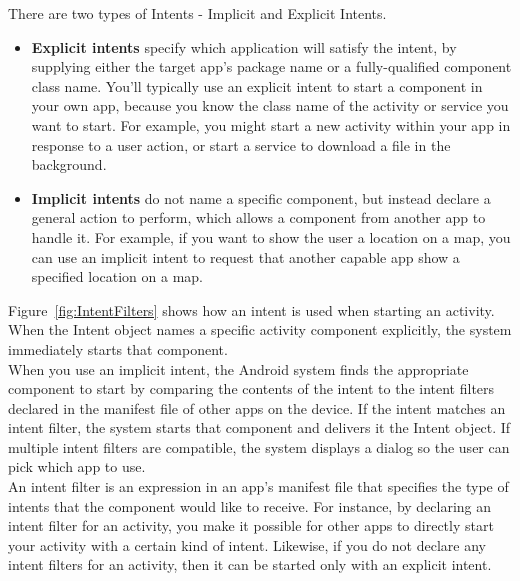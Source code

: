 \documentclass[14pt]{report}
\begin{document}
						There are two types of Intents - Implicit and Explicit Intents.
						\begin{itemize}
							\item \textbf{Explicit intents} specify which application will satisfy the intent, by supplying either the target app's package name or a fully-qualified component class name. You'll typically use an explicit intent to start a component in your own app, because you know the class name of the activity or service you want to start. For example, you might start a new activity within your app in response to a user action, or start a service to download a file in the background.
							\item \textbf{Implicit intents} do not name a specific component, but instead declare a general action to perform, which allows a component from another app to handle it. For example, if you want to show the user a location on a map, you can use an implicit intent to request that another capable app show a specified location on a map.
						\end{itemize}

						Figure~\ref{fig:IntentFilters}  shows how an intent is used when starting an activity. When the Intent object names a specific activity component explicitly, the system immediately starts that component.\\

						When you use an implicit intent, the Android system finds the appropriate component to start by comparing the contents of the intent to the intent filters declared in the manifest file of other apps on the device. If the intent matches an intent filter, the system starts that component and delivers it the Intent object. If multiple intent filters are compatible, the system displays a dialog so the user can pick which app to use.\\

						An intent filter is an expression in an app's manifest file that specifies the type of intents that the component would like to receive. For instance, by declaring an intent filter for an activity, you make it possible for other apps to directly start your activity with a certain kind of intent. Likewise, if you do not declare any intent filters for an activity, then it can be started only with an explicit intent.
\end{document}
